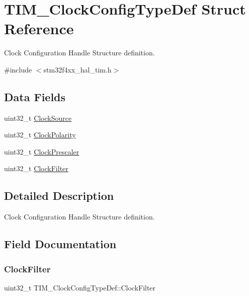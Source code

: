 \hypertarget{struct_t_i_m___clock_config_type_def}{}\section{T\+I\+M\+\_\+\+Clock\+Config\+Type\+Def Struct Reference}
\label{struct_t_i_m___clock_config_type_def}


Clock Configuration Handle Structure definition.  




{\ttfamily \#include $<$stm32f4xx\+\_\+hal\+\_\+tim.\+h$>$}

\subsection*{Data Fields}
\begin{DoxyCompactItemize}
\item 
uint32\+\_\+t \hyperlink{struct_t_i_m___clock_config_type_def_a54c329013b5f6f87d1c3d2495fca84d2}{Clock\+Source}
\item 
uint32\+\_\+t \hyperlink{struct_t_i_m___clock_config_type_def_a66453fa8dc8a300267ff5aba08eff5c4}{Clock\+Polarity}
\item 
uint32\+\_\+t \hyperlink{struct_t_i_m___clock_config_type_def_ae4c0cb6f58da0ec7b99f1c6411d2fee1}{Clock\+Prescaler}
\item 
uint32\+\_\+t \hyperlink{struct_t_i_m___clock_config_type_def_adaf66568c766f75c4c661a872ca399e3}{Clock\+Filter}
\end{DoxyCompactItemize}


\subsection{Detailed Description}
Clock Configuration Handle Structure definition. 

\subsection{Field Documentation}
\mbox{\label{struct_t_i_m___clock_config_type_def_adaf66568c766f75c4c661a872ca399e3}} 
\subsubsection{\texorpdfstring{Clock\+Filter}{ClockFilter}}
{\footnotesize\ttfamily uint32\+\_\+t T\+I\+M\+\_\+\+Clock\+Config\+Type\+Def\+::\+Clock\+Filter}

